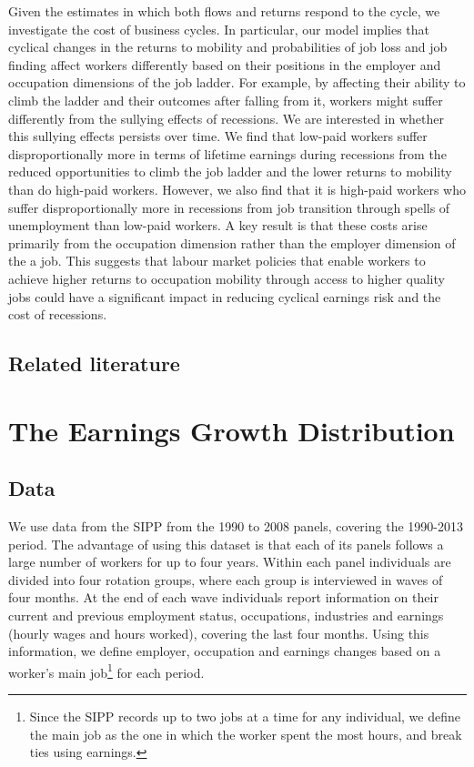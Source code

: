 \documentclass[12pt]{article}
\theoremstyle{definition}
\begin{document}
Given the estimates in which both flows and returns respond to the cycle, we investigate the cost of business cycles. In particular, our model implies that cyclical changes in the returns to mobility and probabilities of job loss and job finding affect workers differently based on their positions in the employer and occupation dimensions of the job ladder. For example, by affecting their ability to climb the ladder and their outcomes after falling from it, workers might suffer differently from the sullying effects of recessions. We are interested in whether this sullying effects persists over time. We find that low-paid workers suffer disproportionally more in terms of lifetime earnings during recessions from the reduced opportunities to climb the job ladder and the lower returns to mobility than do high-paid workers. However, we also find that it is high-paid workers who suffer disproportionally more in recessions from job transition through spells of unemployment than low-paid workers. A key result is that these costs arise primarily from the occupation dimension rather than the employer dimension of the a job. This suggests that labour market policies that enable workers to achieve higher returns to occupation mobility through access to higher quality jobs could have a significant impact in reducing cyclical earnings risk and the cost of recessions.

\subsection{Related literature}

\section{The Earnings Growth Distribution}

\subsection{Data}

We use data from the SIPP from the 1990 to 2008 panels, covering the 1990-2013 period. The advantage of using this dataset is that each of its panels follows a large number of workers for up to four years. Within each panel individuals are divided into four rotation groups, where each group is interviewed in waves of four months. At the end of each wave individuals report information on their current and previous employment status, occupations, industries and earnings (hourly wages and hours worked), covering the last four months. Using this information, we define employer, occupation and earnings changes based on a worker's main job\footnote{Since the SIPP records up to two jobs at a time for any individual, we define the main job as the one in which the worker spent the most hours, and break ties using earnings.} for each period.
\end{document}
